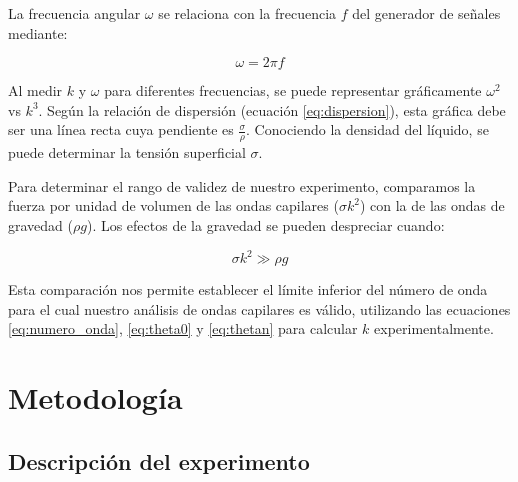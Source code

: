 \vspace{\baselineskip}

La frecuencia angular $\omega$ se relaciona con la frecuencia $f$ del generador de señales mediante:

\begin{equation}
	\omega = 2\pi f
	\label{eq:omega}
\end{equation}

\vspace{\baselineskip}

Al medir $k$ y $\omega$ para diferentes frecuencias, se puede representar gráficamente $\omega^2$ vs $k^3$. Según la relación de dispersión (ecuación \ref{eq:dispersion}), esta gráfica debe ser una línea recta cuya pendiente es $\frac{\sigma}{\rho}$. Conociendo la densidad del líquido, se puede determinar la tensión superficial $\sigma$.

\vspace{\baselineskip}

Para determinar el rango de validez de nuestro experimento, comparamos la fuerza por unidad de volumen de las ondas capilares ($\sigma k^2$) con la de las ondas de gravedad ($\rho g$). Los efectos de la gravedad se pueden despreciar cuando:

\vspace{\baselineskip}

\begin{equation}
	\sigma k^2 \gg \rho g
	\label{eq:validez}
\end{equation}

\vspace{\baselineskip}

Esta comparación nos permite establecer el límite inferior del número de onda para el cual nuestro análisis de ondas capilares es válido, utilizando las ecuaciones \ref{eq:numero_onda}, \ref{eq:theta0} y \ref{eq:thetan} para calcular $k$ experimentalmente.


\section{Metodología}

\subsection{Descripción del experimento}


